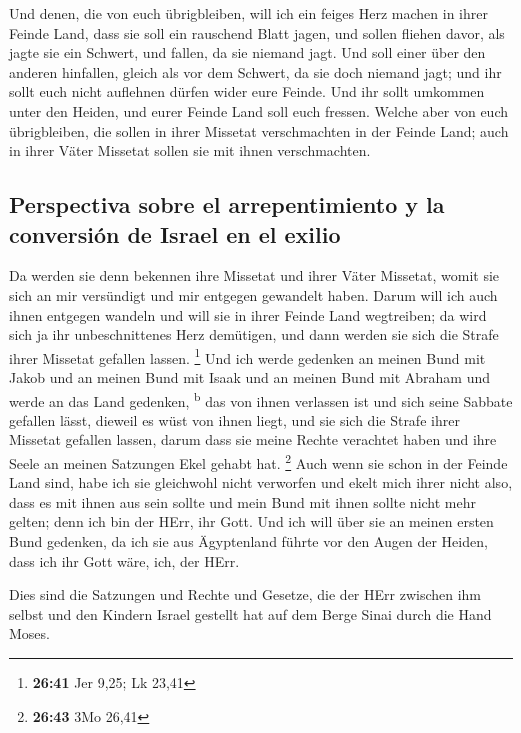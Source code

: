  Und denen, die von euch übrigbleiben, will ich ein
feiges Herz machen in ihrer Feinde Land, dass sie soll ein rauschend
Blatt jagen, und sollen fliehen davor, als jagte sie ein Schwert, und
fallen, da sie niemand jagt.  Und soll einer über den
anderen hinfallen, gleich als vor dem Schwert, da sie doch niemand jagt;
und ihr sollt euch nicht auflehnen dürfen wider eure Feinde.
 Und ihr sollt umkommen unter den Heiden, und eurer
Feinde Land soll euch fressen.  Welche aber von euch
übrigbleiben, die sollen in ihrer Missetat verschmachten in der Feinde
Land; auch in ihrer Väter Missetat sollen sie mit ihnen verschmachten.

\hypertarget{perspectiva-sobre-el-arrepentimiento-y-la-conversiuxf3n-de-israel-en-el-exilio}{%
\subsection{Perspectiva sobre el arrepentimiento y la conversión de
Israel en el
exilio}\label{perspectiva-sobre-el-arrepentimiento-y-la-conversiuxf3n-de-israel-en-el-exilio}}

 Da werden sie denn bekennen ihre Missetat und ihrer
Väter Missetat, womit sie sich an mir versündigt und mir entgegen
gewandelt haben.  Darum will ich auch ihnen entgegen
wandeln und will sie in ihrer Feinde Land wegtreiben; da wird sich ja
ihr unbeschnittenes Herz demütigen, und dann werden sie sich die Strafe
ihrer Missetat gefallen lassen. \footnote{\textbf{26:41} Jer 9,25; Lk
  23,41}  Und ich werde gedenken an meinen Bund mit Jakob
und an meinen Bund mit Isaak und an meinen Bund mit Abraham und werde an
das Land gedenken, \textsuperscript{b}  das von ihnen
verlassen ist und sich seine Sabbate gefallen lässt, dieweil es wüst von
ihnen liegt, und sie sich die Strafe ihrer Missetat gefallen lassen,
darum dass sie meine Rechte verachtet haben und ihre Seele an meinen
Satzungen Ekel gehabt hat. \footnote{\textbf{26:43} 3Mo 26,41}
 Auch wenn sie schon in der Feinde Land sind, habe ich
sie gleichwohl nicht verworfen und ekelt mich ihrer nicht also, dass es
mit ihnen aus sein sollte und mein Bund mit ihnen sollte nicht mehr
gelten; denn ich bin der HErr, ihr Gott.  Und ich will
über sie an meinen ersten Bund gedenken, da ich sie aus Ägyptenland
führte vor den Augen der Heiden, dass ich ihr Gott wäre, ich, der HErr.

 Dies sind die Satzungen und Rechte und Gesetze, die der
HErr zwischen ihm selbst und den Kindern Israel gestellt hat auf dem
Berge Sinai durch die Hand Moses.

